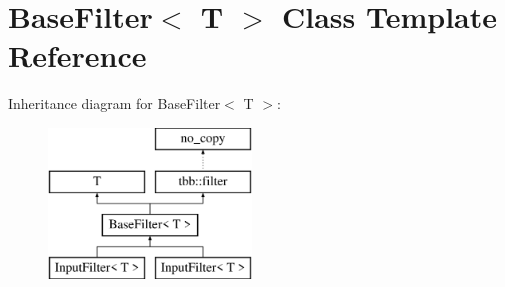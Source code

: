 \hypertarget{classBaseFilter}{}\section{Base\+Filter$<$ T $>$ Class Template Reference}
\label{classBaseFilter}
Inheritance diagram for Base\+Filter$<$ T $>$\+:\begin{figure}[H]
\begin{center}
\leavevmode
\includegraphics[height=4.000000cm]{classBaseFilter}
\end{center}
\end{figure}
